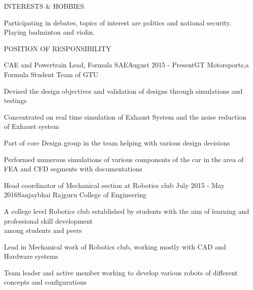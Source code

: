 \documentclass{resume} %
\begin{document}
\vspace{-10pt}
\begin{rSection}{INTERESTS \& HOBBIES} \itemsep -1pt  

\begin{rSubsection}{}{ }{}    

\vspace{-8pt}

\item Participating in debates, topics of interest are politics and national security. Playing badminton and violin.

\end{rSubsection} 


\end{rSection}  


  
\begin{rSection}{POSITION OF RESPONSIBILITY}

\begin{rSubsection}{CAE and Powertrain Lead, Formula SAE}{August 2015 - Present}{GT Motorsports,a Formula Student Team of GTU}{}              
\item Devised the design objectives and validation of designs through simulations and testings
\item Concentrated on real time simulation of Exhaust System and the noise reduction of Exhaust system
\item Part of core Design group in the team helping with various design decisions  
\item Performed numerous simulations of various components of the car in the area of FEA and CFD segments with documentations   
\end{rSubsection}  


\begin{rSubsection}{Head coordinator of Mechanical section at Robotics club} {July 2015 - May 2016}{Sanjaybhai Rajguru College of Engineering}{} 
\item A college level Robotics club established by students with the aim of learning and professional skill development \\among students and peers            
\item Lead in Mechanical work of Robotics club, working mostly with CAD and Hardware systems
\item Team leader and active member working to develop various robots of different concepts and configurations     
\end{rSubsection}

\end{rSection}
  
\end{document}
